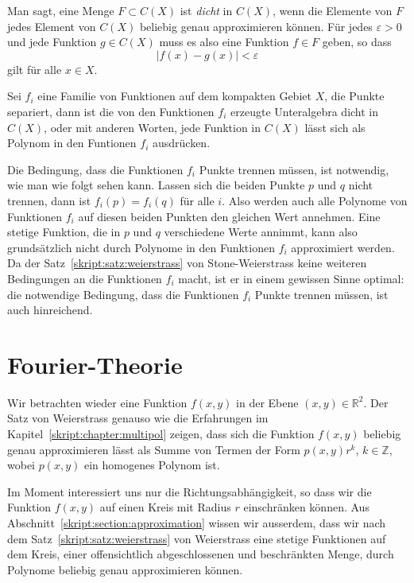 Man sagt, eine Menge $F\subset C(X)$ ist {\em dicht} in $C(X)$, wenn
die Elemente von $F$ jedes Element von $C(X)$ beliebig genau approximieren
können.
%
Für jedes $\varepsilon>0$ und jede Funktion $g\in C(X)$ muss es also eine
Funktion $f\in F$ geben, so dass
\[
|f(x)-g(x)|< \varepsilon
\]
gilt für alle $x\in X$.

\begin{satz}
\label{skript:satz:stone-weierstrass}
%
Sei $f_i$ eine Familie von Funktionen auf dem kompakten Gebiet $X$,
die Punkte separiert, dann ist die von den Funktionen $f_i$ erzeugte
Unteralgebra dicht in $C(X)$, oder mit anderen Worten, jede Funktion
in $C(X)$ lässt sich als Polynom in den Funtionen $f_i$ ausdrücken.
\end{satz}

Die Bedingung, dass die Funktionen $f_i$ Punkte trennen müssen, ist
notwendig, wie man wie folgt sehen kann.
Lassen sich die beiden Punkte $p$ und $q$ nicht trennen, dann
ist $f_i(p)=f_i(q)$ für alle $i$.
Also werden auch alle Polynome von Funktionen $f_i$ auf diesen beiden 
Punkten den gleichen Wert annehmen.
Eine stetige Funktion, die in $p$ und $q$ verschiedene Werte annimmt,
kann also grundsätzlich nicht durch Polynome in den Funktionen
$f_i$ approximiert werden.
Da der Satz~\ref{skript:satz:weierstrass} von Stone-Weierstrass
keine weiteren Bedingungen an die Funktionen $f_i$ macht, ist er
in einem gewissen Sinne optimal: die notwendige Bedingung, dass
die Funktionen $f_i$ Punkte trennen müssen, ist auch hinreichend.

\section{Fourier-Theorie}
Wir betrachten wieder eine Funktion $f(x,y)$ in der Ebene
$(x,y)\in\mathbb R^2$.
Der Satz von Weierstrass genauso wie die Erfahrungen im
Kapitel~\ref{skript:chapter:multipol} zeigen, dass sich die Funktion
$f(x,y)$ beliebig genau approximieren lässt als Summe von Termen der
Form $p(x,y)r^k$, $k\in\mathbb Z$, wobei $p(x,y)$ ein homogenes Polynom ist.

Im Moment interessiert uns nur die Richtungsabhängigkeit, so dass wir
die Funktion $f(x,y)$ auf einen Kreis mit Radius $r$ einschränken können.
Aus Abschnitt~\ref{skript:section:approximation} wissen wir ausserdem,
dass wir nach dem Satz~\ref{skript:satz:weierstrass} von Weierstrass
eine stetige Funktionen auf dem Kreis, einer offensichtlich
abgeschlossenen und beschränkten Menge, durch Polynome beliebig
genau approximieren können.

